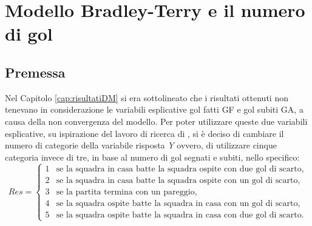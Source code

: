
\chapter{Modello Bradley-Terry e il numero di gol }
\label{cap:extraDM}
\section{Premessa}
Nel Capitolo \ref{cap:risultatiDM} si era sottolineato che i risultati ottenuti non tenevano in considerazione le variabili esplicative gol fatti \textsf{GF} e gol subiti \textsf{GA}, a causa della non convergenza del modello. Per poter utilizzare queste due variabili esplicative, su ispirazione del lavoro di ricerca di \textcite{schauberger2017}, si è deciso di cambiare il numero di categorie della variabile risposta \emph{Y} ovvero, di utilizzare cinque categoria invece di tre, in base al numero di gol segnati e subiti, nello specifico:
\begin{equation}
	Res =
	\begin{cases}
		1 & \text{se la squadra in casa batte la squadra ospite con due gol di scarto,}\\
		2 & \text{se la squadra in casa batte la squadra ospite con un gol di scarto,}\\
		3 & \text{se la partita termina con un pareggio,}\\
		4 & \text{se la squadra ospite batte la squadra in casa con un gol di scarto, }\\
		5 & \text{se la squadra ospite batte la squadra in casa con due gol di scarto.}
	\end{cases}       
\end{equation}

